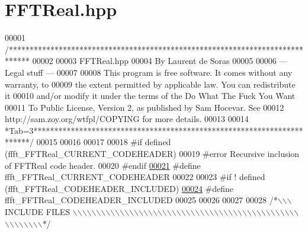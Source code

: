 \hypertarget{a00096_source}{\section{F\+F\+T\+Real.\+hpp}
\label{a00096_source}
}

\begin{DoxyCode}
00001 \textcolor{comment}{/*****************************************************************************}
00002 \textcolor{comment}{}
00003 \textcolor{comment}{        FFTReal.hpp}
00004 \textcolor{comment}{        By Laurent de Soras}
00005 \textcolor{comment}{}
00006 \textcolor{comment}{--- Legal stuff ---}
00007 \textcolor{comment}{}
00008 \textcolor{comment}{This program is free software. It comes without any warranty, to}
00009 \textcolor{comment}{the extent permitted by applicable law. You can redistribute it}
00010 \textcolor{comment}{and/or modify it under the terms of the Do What The Fuck You Want}
00011 \textcolor{comment}{To Public License, Version 2, as published by Sam Hocevar. See}
00012 \textcolor{comment}{http://sam.zoy.org/wtfpl/COPYING for more details.}
00013 \textcolor{comment}{}
00014 \textcolor{comment}{*Tab=3***********************************************************************/}
00015 
00016 
00017 
00018 \textcolor{preprocessor}{#if defined (ffft\_FFTReal\_CURRENT\_CODEHEADER)}
00019 \textcolor{preprocessor}{    #error Recursive inclusion of FFTReal code header.}
00020 \textcolor{preprocessor}{#endif}
\hypertarget{a00096_source_l00021}{}\hyperlink{a00096_a7e1c53e720f689723accc78c4835f91c}{00021} \textcolor{preprocessor}{#define ffft\_FFTReal\_CURRENT\_CODEHEADER}
00022 
00023 \textcolor{preprocessor}{#if ! defined (ffft\_FFTReal\_CODEHEADER\_INCLUDED)}
\hypertarget{a00096_source_l00024}{}\hyperlink{a00096_adf3b5663ee12a1d9e612686163e7ad52}{00024} \textcolor{preprocessor}{#define ffft\_FFTReal\_CODEHEADER\_INCLUDED}
00025 
00026 
00027 
00028 \textcolor{comment}{/*\(\backslash\)\(\backslash\)\(\backslash\) INCLUDE FILES \(\backslash\)\(\backslash\)\(\backslash\)\(\backslash\)\(\backslash\)\(\backslash\)\(\backslash\)\(\backslash\)\(\backslash\)\(\backslash\)\(\backslash\)\(\backslash\)\(\backslash\)\(\backslash\)\(\backslash\)\(\backslash\)\(\backslash\)\(\backslash\)\(\backslash\)\(\backslash\)\(\backslash\)\(\backslash\)\(\backslash\)\(\backslash\)\(\backslash\)\(\backslash\)\(\backslash\)\(\backslash\)\(\backslash\)\(\backslash\)\(\backslash\)\(\backslash\)\(\backslash\)\(\backslash\)\(\backslash\)\(\backslash\)\(\backslash\)\(\backslash\)\(\backslash\)\(\backslash\)\(\backslash\)\(\backslash\)\(\backslash\)\(\backslash\)\(\backslash\)\(\backslash\)\(\backslash\)\(\backslash\)\(\backslash\)\(\backslash\)\(\backslash\)\(\backslash\)\(\backslash\)\(\backslash\)\(\backslash\)\(\backslash\)*/}

\end{DoxyCode}
